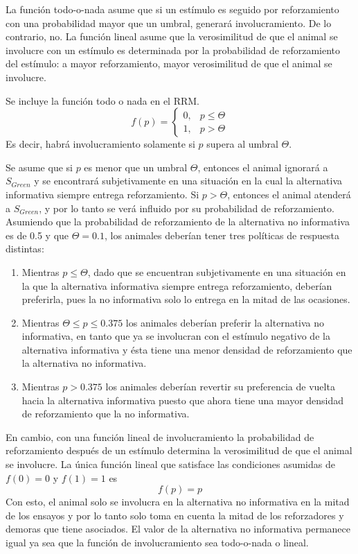 \documentclass[a4paper,12pt]{article}
\begin{document}
La función todo-o-nada asume que si un estímulo es seguido por reforzamiento con una probabilidad mayor que un umbral, generará involucramiento. De lo contrario, no.  La función lineal asume que la verosimilitud de que el animal se involucre con un estímulo es determinada por la probabilidad de reforzamiento del estímulo: a mayor reforzamiento, mayor verosimilitud de que el animal se involucre.

Se incluye la función todo o nada en el RRM.
$$
f(p) = \left\{\begin{array}{ll}
		0,&p\leq\Theta\\
		1,&p>\Theta
	\end{array}
	\right.
$$
Es decir, habrá involucramiento solamente si $p$ supera al umbral $\Theta$.

Se asume que si $p$ es menor que un umbral $\Theta$, entonces el animal ignorará a $S_{Green}$ y se encontrará subjetivamente en una situación en la cual la alternativa informativa siempre entrega reforzamiento. Si $p>\Theta$, entonces el animal atenderá a $S_{Green}$, y por lo tanto se verá influido por su probabilidad de reforzamiento. Asumiendo que la probabilidad de reforzamiento de la alternativa no informativa es de 0.5 y que $\Theta=0.1$, los animales deberían tener tres políticas de respuesta distintas:

\begin{enumerate}
	\item Mientras $p\leq\Theta$, dado que se encuentran subjetivamente en una situación en la que la alternativa informativa siempre entrega reforzamiento, deberían preferirla, pues la no informativa solo lo entrega en la mitad de las ocasiones.
	\item Mientras $\Theta \leq p \leq 0{.}375$ los animales deberían preferir la alternativa no informativa, en tanto que ya se involucran con el estímulo negativo de la alternativa informativa y ésta tiene una menor densidad de reforzamiento que la alternativa no informativa.
	\item Mientras $p > 0{.}375$ los animales deberían revertir su preferencia de vuelta hacia la alternativa informativa puesto que ahora tiene una  mayor densidad de reforzamiento que la no informativa.
\end{enumerate}

En cambio, con una función lineal de involucramiento la probabilidad de reforzamiento después de un estímulo determina la verosimilitud de que el animal se involucre. La única función lineal que satisface las condiciones asumidas de $f(0)=0$ y $f(1)=1$ es 
$$
f(p)=p
$$
Con esto, el animal solo se involucra en la alternativa no informativa en la mitad de los ensayos y por lo tanto solo toma en cuenta la mitad de los reforzadores y demoras que tiene asociados. El valor de la alternativa no informativa permanece igual ya sea que la función de involucramiento sea todo-o-nada o lineal.
\end{document}
